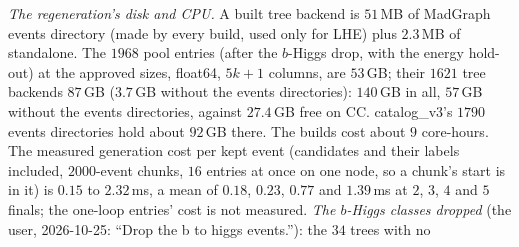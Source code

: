 \documentclass[11pt]{article}
\begin{document}
\begin{itemize}
    \emph{The regeneration's disk and CPU.} A built tree backend is $51$\,MB of MadGraph events directory (made by every
    build, used only for LHE) plus $2.3$\,MB of standalone. The $1968$ pool entries (after the $b$-Higgs drop, with the energy hold-out) at the approved sizes, float64,
    $5k+1$ columns, are $53$\,GB; their $1621$ tree backends $87$\,GB ($3.7$\,GB without the events directories): $140$\,GB in
    all, $57$\,GB without the events directories, against $27.4$\,GB free on CC. catalog\_v3's $1790$ events
    directories hold about $92$\,GB there. The builds cost about $9$ core-hours.
    The measured generation cost per kept event (candidates and their labels included, $2000$-event chunks, $16$
    entries at once on one node, so a chunk's start is in it) is $0.15$ to $2.32$\,ms, a mean of $0.18$, $0.23$,
    $0.77$ and $1.39$\,ms at $2$, $3$, $4$ and $5$ finals; the one-loop entries' cost is not measured.
    \emph{The $b$-Higgs classes dropped} (the user, 2026-10-25: ``Drop the b to higgs events.''): the $34$ trees with no

\end{itemize}
\end{document}
